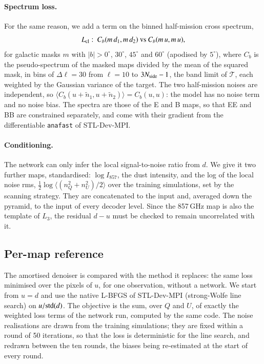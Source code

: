 \documentclass{aa}
\newcommand{\nside}{N_{\rm side}}
\begin{document}
\paragraph{Spectrum loss.} For the same reason, we add a term on the binned half-mission cross spectrum,
\begin{equation}
  L_{\rm cl}:\ C_b(m\,d_1,m\,d_2)\ \text{vs}\ C_b(m\,u,m\,u),
\end{equation}
for galactic masks $m$ with $|b|>0^\circ$, $30^\circ$, $45^\circ$ and $60^\circ$ (apodised by $5^\circ$), where $C_b$ is the pseudo-spectrum of the masked maps divided by the mean of the squared mask, in bins of $\Delta\ell=30$ from $\ell=10$ to $3\nside-1$, the band limit of $\mathcal{T}$, each weighted by the Gaussian variance of the target. The two half-mission noises are independent, so $\langle C_b(u+\tilde n_1,u+\tilde n_2)\rangle=C_b(u,u)$: the model has no noise term and no noise bias. The spectra are those of the E and B maps, so that EE and BB are constrained separately, and come with their gradient from the differentiable \texttt{anafast} of STL-Dev-MPI.

\paragraph{Conditioning.} The network can only infer the local signal-to-noise ratio from $d$. We give it two further maps, standardised: $\log I_{857}$, the dust intensity, and the log of the local noise rms, $\tfrac12\log\langle(n_Q^2+n_U^2)/2\rangle$ over the training simulations, set by the scanning strategy. They are concatenated to the input and, averaged down the pyramid, to the input of every decoder level. Since the 857\,GHz map is also the template of $L_3$, the residual $d-u$ must be checked to remain uncorrelated with it.

\subsection{Per-map reference}\label{sec:lbfgs}

The amortised denoiser is compared with the method it replaces: the same loss minimised over the pixels of $u$, for one observation, without a network. We start from $u=d$ and use the native L-BFGS of STL-Dev-MPI (strong-Wolfe line search) on $u/{\rm std}(d)$. The objective is the sum, over $Q$ and $U$, of exactly the weighted loss terms of the network run, computed by the same code. The noise realisations are drawn from the training simulations; they are fixed within a round of 50 iterations, so that the loss is deterministic for the line search, and redrawn between the ten rounds, the biases being re-estimated at the start of every round.
\end{document}
